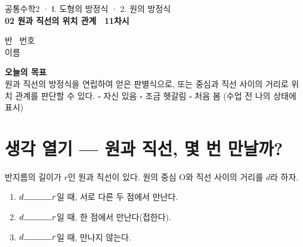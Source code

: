 \documentclass[11pt,a4paper]{article}
\newcommand{\fillblank}[1]{\makebox[#1]{\hrulefill}}
\begin{document}
\noindent
\begin{minipage}[b]{0.62\linewidth}
  {\sffamily\footnotesize\color{indigosoft} 공통수학2 · Ⅰ. 도형의 방정식 · 2. 원의 방정식}\\[2pt]
  {\sffamily\bfseries\Large 02 원과 직선의 위치 관계 \textperiodcentered\ 11차시}
\end{minipage}\hfill
\begin{minipage}[b]{0.36\linewidth}
  \raggedleft\small\color{inksoft}
  반\ \fillblank{1.6cm} \quad 번호\ \fillblank{1.6cm}\\[4pt]
  이름\ \fillblank{3.6cm}
\end{minipage}

\vspace{4pt}
\noindent{\color{goldc}\rule{\linewidth}{2.2pt}}
\vspace{10pt}

\begin{goalbox}
\textbf{오늘의 목표}\\
원과 직선의 방정식을 연립하여 얻은 판별식으로, 또는 중심과 직선 사이의 거리로 위치 관계를 판단할 수 있다.
\vspace{4pt}
\small\color{inksoft}
$\square$ 자신 있음 \quad $\square$ 조금 헷갈림 \quad $\square$ 처음 봄 \hfill (수업 전 나의 상태에 표시)
\end{goalbox}

\section{생각 열기 --- 원과 직선, 몇 번 만날까?}

\begin{sheetbox}
반지름의 길이가 $r$인 원과 직선이 있다. 원의 중심 O와 직선 사이의 거리를 $d$라 하자.

\begin{center}
\end{center}

\begin{enumerate}[leftmargin=1.4em, itemsep=3pt]
  \item $d \fillblank{1.2cm} r$일 때, 서로 다른 두 점에서 만난다.
  \item $d \fillblank{1.2cm} r$일 때, 한 점에서 만난다(접한다).
  \item $d \fillblank{1.2cm} r$일 때, 만나지 않는다.
\end{enumerate}
\end{sheetbox}
\end{document}
